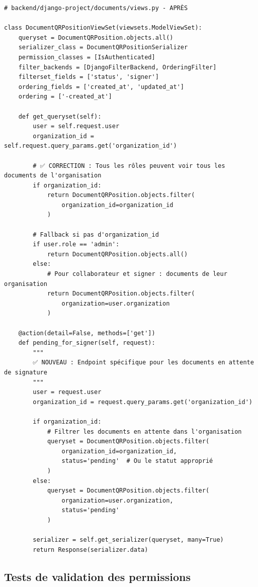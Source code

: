 \documentclass[12pt,a4paper]{article}
\begin{document}
\begin{lstlisting}[style=python, caption={Code corrigé pour les permissions des signers}]
# backend/django-project/documents/views.py - APRÈS

class DocumentQRPositionViewSet(viewsets.ModelViewSet):
    queryset = DocumentQRPosition.objects.all()
    serializer_class = DocumentQRPositionSerializer
    permission_classes = [IsAuthenticated]
    filter_backends = [DjangoFilterBackend, OrderingFilter]
    filterset_fields = ['status', 'signer']
    ordering_fields = ['created_at', 'updated_at']
    ordering = ['-created_at']

    def get_queryset(self):
        user = self.request.user
        organization_id = self.request.query_params.get('organization_id')
        
        # ✅ CORRECTION : Tous les rôles peuvent voir tous les documents de l'organisation
        if organization_id:
            return DocumentQRPosition.objects.filter(
                organization_id=organization_id
            )
        
        # Fallback si pas d'organization_id
        if user.role == 'admin':
            return DocumentQRPosition.objects.all()
        else:
            # Pour collaborateur et signer : documents de leur organisation
            return DocumentQRPosition.objects.filter(
                organization=user.organization
            )

    @action(detail=False, methods=['get'])
    def pending_for_signer(self, request):
        """
        ✅ NOUVEAU : Endpoint spécifique pour les documents en attente de signature
        """
        user = request.user
        organization_id = request.query_params.get('organization_id')
        
        if organization_id:
            # Filtrer les documents en attente dans l'organisation
            queryset = DocumentQRPosition.objects.filter(
                organization_id=organization_id,
                status='pending'  # Ou le statut approprié
            )
        else:
            queryset = DocumentQRPosition.objects.filter(
                organization=user.organization,
                status='pending'
            )
        
        serializer = self.get_serializer(queryset, many=True)
        return Response(serializer.data)
\end{lstlisting}

\subsection{Tests de validation des permissions}
\end{document}
